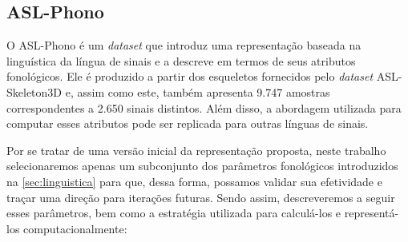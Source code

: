 \subsection{ASL-Phono}
\label{sec:metodos-datasets-phono}

O ASL-Phono é um \textit{dataset} que introduz uma representação baseada na linguística da língua de sinais e a descreve em termos de seus atributos fonológicos. 
Ele é produzido a partir dos esqueletos fornecidos pelo \textit{dataset} ASL-Skeleton3D e, assim como este, também apresenta 9.747 amostras correspondentes a 2.650 sinais distintos. 
Além disso, a abordagem utilizada para computar esses atributos pode ser replicada para outras línguas de sinais.

Por se tratar de uma versão inicial da representação proposta, neste trabalho selecionaremos apenas um subconjunto dos parâmetros fonológicos introduzidos na \autoref{sec:linguistica} para que, dessa forma, possamos validar sua efetividade e traçar uma direção para iterações futuras.
Sendo assim, descreveremos a seguir esses parâmetros, bem como a estratégia utilizada para calculá-los e representá-los computacionalmente:



